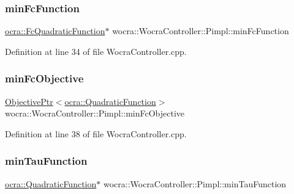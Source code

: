 \hypertarget{structwocra_1_1WocraController_1_1Pimpl_af1d4d6700f771ae7c2bf129b7cb1fd06}{}\label{structwocra_1_1WocraController_1_1Pimpl_af1d4d6700f771ae7c2bf129b7cb1fd06} 
\subsubsection{\texorpdfstring{min\+Fc\+Function}{minFcFunction}}
{\footnotesize\ttfamily \hyperlink{classocra_1_1FcQuadraticFunction}{ocra\+::\+Fc\+Quadratic\+Function}$\ast$ wocra\+::\+Wocra\+Controller\+::\+Pimpl\+::min\+Fc\+Function}



Definition at line 34 of file Wocra\+Controller.\+cpp.

\hypertarget{structwocra_1_1WocraController_1_1Pimpl_a204f0258bde95ab0f29d1d1937cd80d2}{}\label{structwocra_1_1WocraController_1_1Pimpl_a204f0258bde95ab0f29d1d1937cd80d2} 
\subsubsection{\texorpdfstring{min\+Fc\+Objective}{minFcObjective}}
{\footnotesize\ttfamily \hyperlink{classocra_1_1ObjectivePtr}{Objective\+Ptr}$<$\hyperlink{classocra_1_1QuadraticFunction}{ocra\+::\+Quadratic\+Function}$>$ wocra\+::\+Wocra\+Controller\+::\+Pimpl\+::min\+Fc\+Objective}



Definition at line 38 of file Wocra\+Controller.\+cpp.

\hypertarget{structwocra_1_1WocraController_1_1Pimpl_a49e2adcc51cd75b3a17ebf31cf497d31}{}\label{structwocra_1_1WocraController_1_1Pimpl_a49e2adcc51cd75b3a17ebf31cf497d31} 
\subsubsection{\texorpdfstring{min\+Tau\+Function}{minTauFunction}}
{\footnotesize\ttfamily \hyperlink{classocra_1_1QuadraticFunction}{ocra\+::\+Quadratic\+Function}$\ast$ wocra\+::\+Wocra\+Controller\+::\+Pimpl\+::min\+Tau\+Function}



